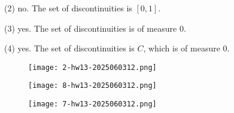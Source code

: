 (2) no. The set of discontinuities is $[0,1]$.

(3) yes. The set of discontinuities  is of measure 0.

(4) yes. The set of discontinuities  is $C$, which is of measure 0.

\begin{exercise}
\begin{figure}[H]
\centering
\texttt{[image: 2-hw13-2025060312.png]}
\label{}
\end{figure}
\end{exercise}
\begin{figure}[H]
\centering
\texttt{[image: 8-hw13-2025060312.png]}
\label{}
\end{figure}
\begin{figure}[H]
\centering
\texttt{[image: 7-hw13-2025060312.png]}
\label{}
\end{figure}

